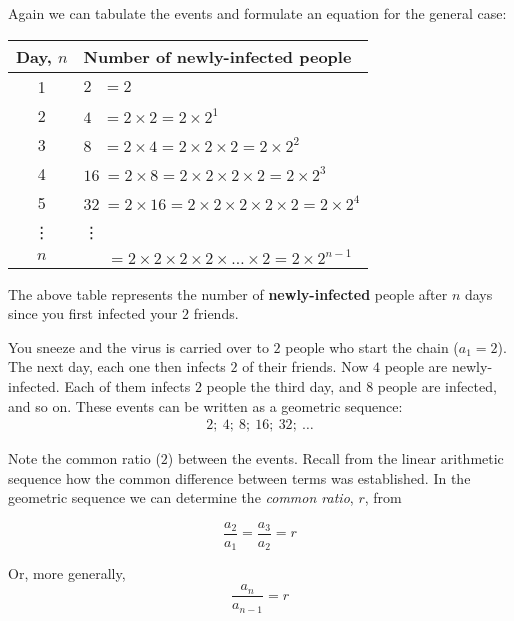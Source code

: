 Again we can tabulate the events and formulate an equation for the general case:
\begin{center}
\begin{tabular}{|c|l|}\hline
\hline \textbf{Day}, $n$ & \textbf{Number of newly-infected people} \\\hline
\hline 1 & $2 \: \: \: = 2$ \\
\hline 2 & $4 \: \: \: = 2 \times 2 = 2 \times 2^1 $ \\
\hline 3 & $8 \: \: \: = 2 \times 4 = 2 \times 2 \times 2 = 2 \times 2^2$ \\
\hline 4 & $16 \: = 2 \times 8 = 2 \times 2 \times 2 \times 2 = 2 \times 2^3$ \\
\hline 5 & $32 \: = 2 \times 16 = 2 \times 2 \times 2 \times 2 \times 2 = 2 \times 2^4$ \\
\hline \vdots & \qquad \qquad \qquad \qquad \vdots \\
\hline $n$ & $\: \: \quad = 2 \times 2 \times 2 \times 2 \times \ldots \times 2 = 2 \times 2^{n-1}$
\\
\hline\hline
\end{tabular}
\end{center}

The above table represents the number of \textbf{newly-infected} people after $n$ days since you
first infected your $2$ friends. 

You sneeze and the virus is carried over to $2$ people who start the chain ($a_1 = 2$).
The next day, each one then infects $2$ of their friends. Now $4$ people are newly-infected.
Each of them infects $2$ people the third day, and $8$ people are infected, and so on.
These events can be written as a geometric sequence:
\begin{eqnarray*}
2; \: 4; \: 8; \: 16; \: 32; \: \ldots
\end{eqnarray*}

Note the common ratio ($2$) between the events. Recall from the linear arithmetic sequence how the
common difference between terms was established. In the geometric sequence we can determine the
\textit{common ratio}, $r$, from

\begin{equation}
\frac{a_2}{a_1} = \frac{a_3}{a_2} = r
\end{equation}

Or, more generally,
\begin{equation}
\label{eq:mp:s:geomseq:1}
\frac{a_n}{a_{n-1}} = r
\end{equation}

